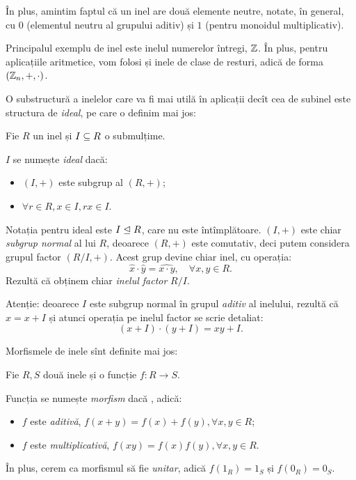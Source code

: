 În plus, amintim faptul că un inel are două elemente neutre, notate, în general,
cu $ 0 $ (elementul neutru al grupului aditiv) și $ 1 $ (pentru monoidul
multiplicativ).

Principalul exemplu de inel este inelul numerelor întregi, $ \mathbb{Z} $. În plus,
pentru aplicațiile aritmetice, vom folosi și inele de clase de resturi,
adică de forma $ (\mathbb{Z}_n, +, \cdot) $.

O substructură a inelelor care va fi mai utilă în aplicații decît cea de
subinel este structura de \emph{ideal}, pe care o definim mai jos:
\begin{definition}\label{def:ideal} 
  Fie $ R $ un inel și $ I \subseteq R $ o submulțime.

  $ I $ se numește \emph{ideal} dacă:
  \begin{itemize}
  \item $ (I, +) $ este subgrup al $ (R, +) $;
  \item $ \forall r \in R, x \in I, rx \in I $.
  \end{itemize}
\end{definition}

Notația pentru ideal este $ I \trianglelefteq R $, care nu este întîmplătoare.
$ (I, +) $ este chiar \emph{subgrup normal} al lui $ R $, deoarece
$ (R, +) $ este comutativ, deci putem considera grupul factor $(R/I, +) $.
Acest grup devine chiar inel, cu operația:
\[
  \widehat{x} \cdot \widehat{y} = \widehat{x \cdot y}, \quad %
  \forall x, y \in R.
\]
Rezultă că obținem chiar \emph{inelul factor} $ R/I $.

\begin{remark}\label{rk:inel-factor}
  Atenție: deoarece $ I $ este subgrup normal în grupul \emph{aditiv} al inelului,
  rezultă că $ \widehat{x} = x + I $ și atunci operația pe inelul factor
  se scrie detaliat:
  \[
    (x + I) \cdot (y + I) = xy + I.
  \]
\end{remark}

Morfismele de inele sînt definite mai jos:
\begin{definition}\label{def:morf-in} 
  Fie $R, S$ două inele și o funcție $ f : R \to S $.

  Funcția se numește \emph{morfism} dacă ,
  adică:
  \begin{itemize}
  \item $ f $ este \emph{aditivă}, $ f(x + y) = f(x) + f(y), \forall x, y \in R $;
  \item $ f $ este \emph{multiplicativă}, $ f(xy) = f(x)f(y), \forall x, y \in R $.
  \end{itemize}

  În plus, cerem ca morfismul să fie \emph{unitar}, adică $ f(1_R) = 1_S $
  și $ f(0_R) = 0_S $.
\end{definition}

